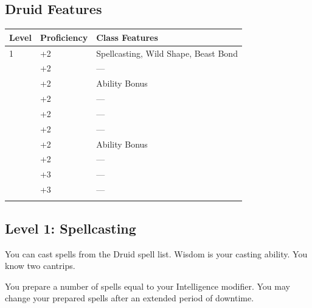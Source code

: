 \documentclass[12pt,letterpaper,twocolumn,openany,nodeprecatedcode,bg=none]{dndbook}
\let\oldsubsection\subsection
\renewcommand{\subsection}[1]{%
  \needspace{5\baselineskip}%
  \oldsubsection{#1}%
}
\begin{document}
\subsection{Druid Features}\label{druid-features}


{\def\LTcaptype{none} %
\begin{table}[!htbp]
\centering
\begin{tabular}{@{}
  >{\raggedright\arraybackslash}p{}
  >{\raggedright\arraybackslash}p{}
  >{\raggedright\arraybackslash}p{}@{}}
\toprule\noalign{}
\begin{minipage}[b]{\linewidth}\raggedright
Level
\end{minipage} & \begin{minipage}[b]{\linewidth}\raggedright
Proficiency
\end{minipage} & \begin{minipage}[b]{\linewidth}\raggedright
Class Features
\end{minipage} \\
\midrule\noalign{}
1 & +2 & Spellcasting, Wild Shape, Beast Bond \\
2 & +2 & --- \\
3 & +2 & Ability Bonus \\
4 & +2 & --- \\
5 & +2 & --- \\
6 & +2 & --- \\
7 & +2 & Ability Bonus \\
8 & +2 & --- \\
9 & +3 & --- \\
10 & +3 & --- \\
\bottomrule\noalign{}
\end{tabular}
\end{table}
}

\subsection{Level 1: Spellcasting}\label{level-1-spellcasting}

You can cast spells from the Druid spell list. Wisdom is your casting
ability. You know two cantrips.

You prepare a number of spells equal to your Intelligence modifier. You
may change your prepared spells after an extended period of downtime.
\end{document}
